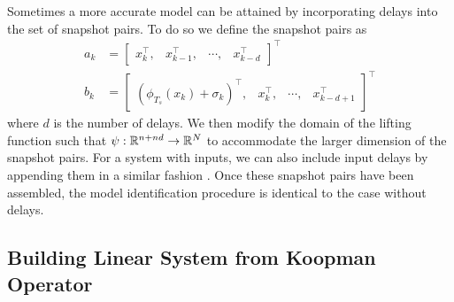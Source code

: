 Sometimes a more accurate model can be attained by incorporating delays into the set of snapshot pairs. To do so we define the snapshot pairs as
\begin{align}
    a_k &= \begin{bmatrix} x_k^\top, & x_{k-1}^\top, & \cdots, & x_{k-d}^\top \end{bmatrix}^\top \\
    b_k &= \begin{bmatrix} \left( \phi_{T_s} (x_k) + \sigma_k \right)^\top, & x_{k}^\top, & \cdots, & x_{k-d+1}^\top \end{bmatrix}^\top
\end{align}
where $d$ is the number of delays.
We then modify the domain of the lifting function such that $\psi : \mathbb{R}^{n+nd} \to \mathbb{R}^{N}$ to accommodate the larger dimension of the snapshot pairs.
For a system with inputs, we can also include input delays by appending them in a similar fashion .
Once these snapshot pairs have been assembled, the model identification procedure is identical to the case without delays.


\subsection{Building Linear System from Koopman Operator}


